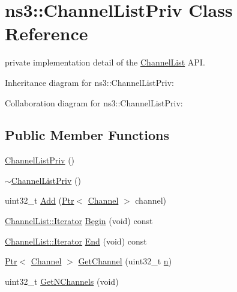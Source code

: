 \hypertarget{classns3_1_1ChannelListPriv}{}\section{ns3\+:\+:Channel\+List\+Priv Class Reference}
\label{classns3_1_1ChannelListPriv}


private implementation detail of the \hyperlink{classns3_1_1ChannelList}{Channel\+List} A\+PI.  




Inheritance diagram for ns3\+:\+:Channel\+List\+Priv\+:


Collaboration diagram for ns3\+:\+:Channel\+List\+Priv\+:
\subsection*{Public Member Functions}
\begin{DoxyCompactItemize}
\item 
\hyperlink{classns3_1_1ChannelListPriv_a0e7e4b151cfce81f9c8bf3fa9c6e0ce4}{Channel\+List\+Priv} ()
\item 
\hyperlink{classns3_1_1ChannelListPriv_adbc754dcd09008c352d86c486657c7da}{$\sim$\+Channel\+List\+Priv} ()
\item 
uint32\+\_\+t \hyperlink{classns3_1_1ChannelListPriv_a117d504c5764b02ec9e5843e2c1a8942}{Add} (\hyperlink{classns3_1_1Ptr}{Ptr}$<$ \hyperlink{classns3_1_1Channel}{Channel} $>$ channel)
\item 
\hyperlink{classns3_1_1ChannelList_a5c0e48f322c6bc465eccfb0a8186d6d6}{Channel\+List\+::\+Iterator} \hyperlink{classns3_1_1ChannelListPriv_abdc6704f1987491aae25134630af683c}{Begin} (void) const 
\item 
\hyperlink{classns3_1_1ChannelList_a5c0e48f322c6bc465eccfb0a8186d6d6}{Channel\+List\+::\+Iterator} \hyperlink{classns3_1_1ChannelListPriv_a1badf1f971f1ae0c6b34c8858a08da31}{End} (void) const 
\item 
\hyperlink{classns3_1_1Ptr}{Ptr}$<$ \hyperlink{classns3_1_1Channel}{Channel} $>$ \hyperlink{classns3_1_1ChannelListPriv_a8b5d78f7e69cc8bacd77f2b418e3e951}{Get\+Channel} (uint32\+\_\+t \hyperlink{lte__link__budget__x2__handover__measures_8m_abdb05bc5a064cf642a06c83b3392f148}{n})
\item 
uint32\+\_\+t \hyperlink{classns3_1_1ChannelListPriv_a295411c98f74f36ccf7289890b7171fb}{Get\+N\+Channels} (void)
\end{DoxyCompactItemize}
